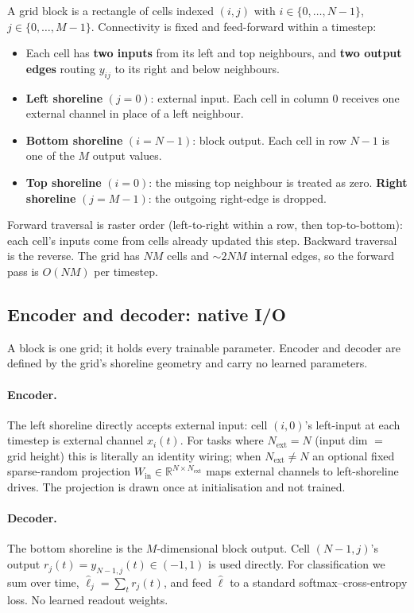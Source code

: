 \documentclass[11pt]{article}
\begin{document}
A grid block is a rectangle of cells indexed $(i, j)$ with
$i \in \{0, \ldots, N{-}1\}$, $j \in \{0, \ldots, M{-}1\}$. Connectivity
is fixed and feed-forward within a timestep:
\begin{itemize}[leftmargin=*]
\item Each cell has \textbf{two inputs} from its left and top neighbours,
and \textbf{two output edges} routing $y_{ij}$ to its right and below
neighbours.
\item \textbf{Left shoreline} $(j{=}0)$: external input. Each cell in
column $0$ receives one external channel in place of a left neighbour.
\item \textbf{Bottom shoreline} $(i{=}N{-}1)$: block output. Each cell in
row $N{-}1$ is one of the $M$ output values.
\item \textbf{Top shoreline} $(i{=}0)$: the missing top neighbour is
treated as zero. \textbf{Right shoreline} $(j{=}M{-}1)$: the outgoing
right-edge is dropped.
\end{itemize}
Forward traversal is raster order (left-to-right within a row, then
top-to-bottom): each cell's inputs come from cells already updated this
step. Backward traversal is the reverse. The grid has $NM$ cells and
$\sim 2NM$ internal edges, so the forward pass is $O(NM)$ per timestep.

\subsection{Encoder and decoder: native I/O}
\label{sec:encdec}

A block is one grid; it holds every trainable parameter. Encoder and
decoder are defined by the grid's shoreline geometry and carry no
learned parameters.

\paragraph{Encoder.} The left shoreline directly accepts external input:
cell $(i, 0)$'s left-input at each timestep is external channel $x_i(t)$.
For tasks where $N_{\text{ext}} = N$ (input dim $=$ grid height) this is
literally an identity wiring; when $N_{\text{ext}} \ne N$ an optional
fixed sparse-random projection $W_{\text{in}} \in \mathbb{R}^{N \times
N_{\text{ext}}}$ maps external channels to left-shoreline drives. The
projection is drawn once at initialisation and not trained.

\paragraph{Decoder.} The bottom shoreline is the $M$-dimensional block
output. Cell $(N{-}1, j)$'s output $r_j(t) = y_{N-1,j}(t) \in (-1, 1)$
is used directly. For classification we sum over time,
$\hat{\ell}_j = \sum_t r_j(t)$, and feed $\hat{\ell}$ to a standard
softmax--cross-entropy loss. No learned readout weights.
\end{document}
